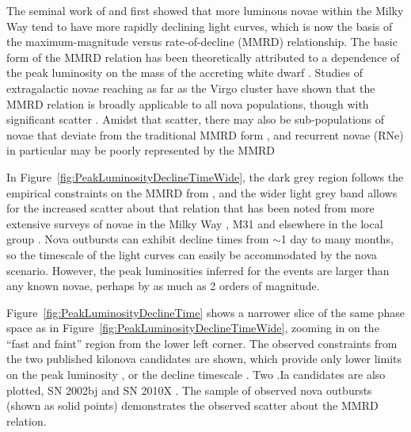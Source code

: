 The seminal work of \citet{Zwicky:1936} and \citet{McLaughlin:1939}
first showed that more luminous novae within the Milky Way tend to
have more rapidly declining light curves, which is now the basis of
the maximum-magnitude versus rate-of-decline (MMRD) relationship. The
basic form of the MMRD relation has been theoretically attributed to a
dependence of the peak luminosity on the mass of the accreting white
dwarf \citep[e.g.][]{Livio:1992}.  Studies of extragalactic novae
reaching as far as the Virgo cluster have shown that the MMRD relation
is broadly applicable to all nova populations, though with significant
scatter
\citep[e.g.][]{Ciardullo:1990,DellaValle:1995,Ferrarese:2003,Shafter:2011}.
Amidst that scatter, there may also be sub-populations of novae that
deviate from the traditional MMRD form \citep{Kasliwal:2011a}, and
recurrent novae (RNe) in particular may be poorly represented by the
MMRD \citep{Shafter:2011,Hachisu:2015}

In Figure~\ref{fig:PeakLuminosityDeclineTimeWide}, the dark grey
region follows the empirical constraints on the MMRD from
\citet{DellaValle:1995}, and the wider light grey band allows for the
increased scatter about that relation that has been noted from more
extensive surveys of novae in the Milky Way \citep{Downes:2000}, M31
\citep{Shafter:2011} and elsewhere in the local group
\citep{Kasliwal:2011a}.  Nova outbursts can exhibit decline times from
$\sim$1 day to many months, so the timescale of the \spock light
curves can easily be accommodated by the nova scenario. However, the
peak luminosities inferred for the \spock events are larger than any
known novae, perhaps by as much as 2 orders of magnitude.

Figure~\ref{fig:PeakLuminosityDeclineTime} shows a narrower slice of
the same phase space as in
Figure~\ref{fig:PeakLuminosityDeclineTimeWide}, zooming in on the
``fast and faint'' region from the lower left corner.  The observed
constraints from the two published kilonova candidates are shown,
which provide only lower limits on the peak luminosity
\citep{Tanvir:2013}, or the decline timescale \citep{Perley:2009}.
Two .Ia candidates are also plotted, SN 2002bj \citep{Poznanski:2010}
and SN 2010X \citep{Kasliwal:2010}.  The sample of observed nova
outbursts (shown as solid points) demonstrates the observed scatter
about the MMRD relation.


